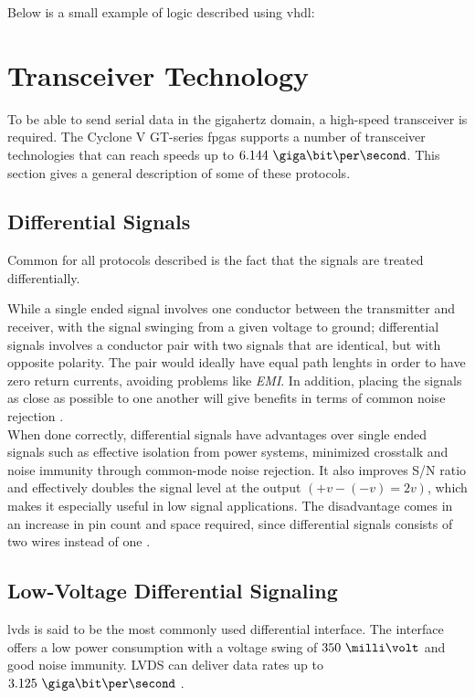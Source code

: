 \documentclass[main.tex]{subfiles}
\begin{document}
Below is a small example of logic described using \acrshort{vhdl}:

\section{Transceiver Technology}

To be able to send serial data in the gigahertz domain, a high-speed transceiver is required. The Cyclone V GT-series \glspl{fpga} supports a number of transceiver technologies that can reach speeds up to $6.144\ \giga\bit\per\second$. This section gives a general description of some of these protocols.

\subsection{Differential Signals} \label{subsec:diffsig}

Common for all protocols described is the fact that the signals are treated differentially. 

While a single ended signal involves one conductor between the transmitter and receiver, with the signal swinging from a given voltage to ground; differential signals involves a conductor pair with two signals that are identical, but with opposite polarity. The pair would ideally have equal path lenghts in order to have zero return currents, avoiding problems like \textit{EMI}. In addition, placing the signals as close as possible to one another will give benefits in terms of common noise rejection \cite{douglas01}.\\

When done correctly, differential signals have advantages over single ended signals such as effective isolation from power systems, minimized crosstalk and noise immunity through common-mode noise rejection. It also improves S/N ratio and effectively doubles the signal level at the output $(+v - (-v) = 2v)$, which makes it especially useful in low signal applications. The disadvantage comes in an increase in pin count and space required, since differential signals consists of two wires instead of one \cite{douglas01}.

\subsection{Low-Voltage Differential Signaling}

\gls{lvds} is said to be the most commonly used differential interface. The interface offers a low power consumption with a voltage swing of $350\ \milli\volt$ and good noise immunity. LVDS can deliver data rates up to $3.125\ \giga\bit\per\second$ \cite{ti08lvds}.
\end{document}
